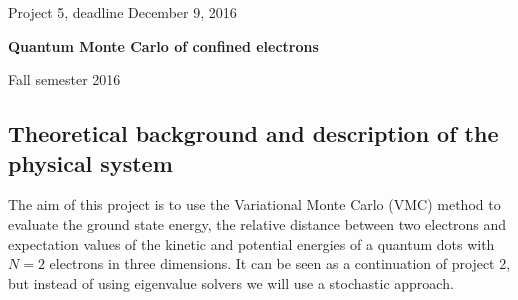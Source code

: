 \documentclass[%
oneside,                 %
final,                   %
10pt]{article}
\begin{document}

\newcommand{\exercisesection}[1]{\subsection*{#1}}






\thispagestyle{empty}

\begin{center}
{\LARGE\bf
\begin{spacing}{1.25}
Project 5, deadline  December 9, 2016
\end{spacing}
}
\end{center}


\begin{center}
{\bf Quantum Monte Carlo of confined electrons${}^{}$} \\ [0mm]
\end{center}

\begin{center}
\end{center}
    

\begin{center}
Fall semester 2016
\end{center}

\vspace{1cm}


\subsection*{Theoretical background and description of the physical system}

The aim of this project is to use the Variational Monte Carlo (VMC)
method to evaluate the ground state energy, the relative distance between two electrons and
expectation values of the kinetic and potential energies of a quantum dots with $N=2$
electrons in three dimensions. It can be seen as a continuation of project 2, but instead of using eigenvalue solvers
we will use a stochastic approach.
\end{document}
